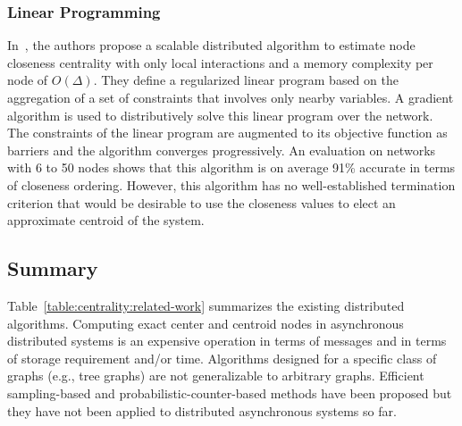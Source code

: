
\subsubsection{Linear Programming}

 
In~\cite{wang2015distributed}, the authors propose a scalable distributed algorithm to estimate node closeness centrality with only local interactions and a memory complexity per node of $O(\Delta)$. They define a regularized linear program based on the aggregation of a set of constraints that involves only nearby variables. A gradient algorithm is used to distributively solve this linear program over the network. The constraints of the linear program are augmented to its objective function as barriers and the algorithm converges progressively. An evaluation on networks with 6 to 50 nodes shows that this algorithm is on average 91\% accurate in terms of closeness ordering. However, this algorithm has no well-established termination criterion that would be desirable to use the closeness values to elect an approximate centroid of the system.

\subsection{Summary}

Table~\ref{table:centrality:related-work} summarizes the existing distributed algorithms. Computing exact center and centroid nodes in asynchronous distributed systems is an expensive operation in terms of messages and in terms of storage requirement and/or time. Algorithms designed for a specific class of graphs (e.g., tree graphs) are not generalizable to arbitrary graphs. Efficient sampling-based and probabilistic-counter-based methods have been proposed but they have not been applied to distributed asynchronous systems so far.

